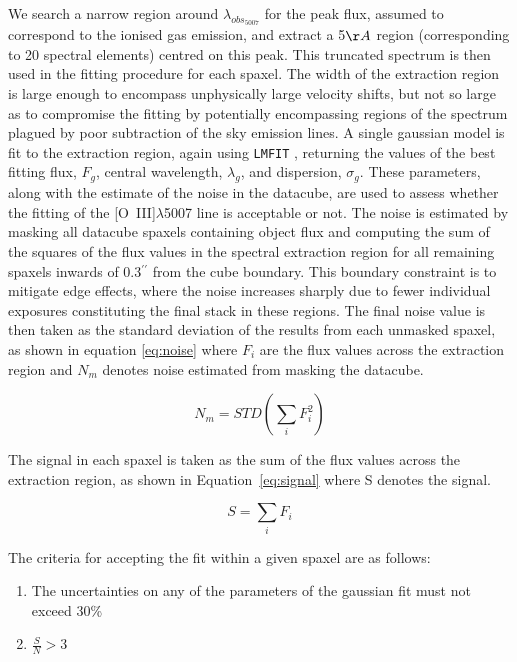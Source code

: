 \documentclass[fleqn,usenatbib]{mn2e}
\begin{document}
We search a narrow region around $\lambda_{obs_{5007}}$ for the peak flux, assumed to correspond to the ionised gas emission, and extract a 5$\AA$ region (corresponding to 20 spectral elements) centred on this peak.
This truncated spectrum is then used in the fitting procedure for each spaxel.
The width of the extraction region is large enough to encompass unphysically large velocity shifts, but not so large as to compromise the fitting by potentially encompassing regions of the spectrum plagued by poor subtraction of the sky emission lines.
A single gaussian model is fit to the extraction region, again using {\tt LMFIT} \citep{Newville2014}, returning the values of the best fitting flux, $F_{g}$, central wavelength, $\lambda_{g}$, and dispersion, $\sigma_{g}$.
These parameters, along with the estimate of the noise in the datacube, are used to assess whether the fitting of the [O~{\sc III}]$\lambda$5007 line is acceptable or not. 
The noise is estimated by masking all datacube spaxels containing object flux and computing the sum of the squares of the flux values in the spectral extraction region for all remaining spaxels inwards of 0.3$^{\prime\prime}$ from the cube boundary.
This boundary constraint is to mitigate edge effects, where the noise increases sharply due to fewer individual exposures constituting the final stack in these regions.
The final noise value is then taken as the standard deviation of the results from each unmasked spaxel, as shown in equation \ref{eq:noise} where $F_{i}$ are the flux values across the extraction region and $N_{m}$ denotes noise estimated from masking the datacube.

\begin{equation}\label{eq:noise}
    N_{m} = STD\left(\sum_{i}F_{i}^{2}\right)
\end{equation}

The signal in each spaxel is taken as the sum of the flux values across the extraction region, as shown in Equation~\ref{eq:signal} where S denotes the signal.

\begin{equation}\label{eq:signal}
    S = \sum_{i}F_{i}
\end{equation}

The criteria for accepting the fit within a given spaxel are as follows:

\begin{enumerate}
\item The uncertainties on any of the parameters of the gaussian fit must not exceed 30\%
\item $\frac{S}{N} > 3$
\end{enumerate}
\end{document}
